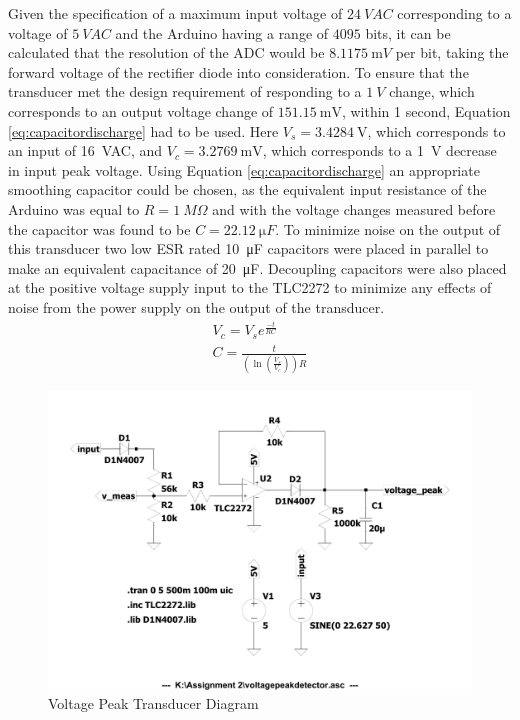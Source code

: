 Given the specification of a maximum input voltage of $\SI{24}{VAC}$ corresponding to a voltage of $\SI{5}{VAC}$ and the Arduino having a range of $4095$ bits, it can be calculated that the resolution of the ADC would be $\SI{8.1175}{\milli V}$ per bit, taking the forward voltage of the rectifier diode into consideration. To ensure that the transducer met the design requirement of responding to a $\SI{1}{V}$ change, which corresponds to an output voltage change of $\SI{151.15}{\milli \volt}$, within 1 second, Equation \ref{eq:capacitordischarge} had to be used. Here $V_{s}=\SI{3.4284}{\volt}$, which corresponds to an input of \SI{16}{VAC}, and $V_{c}=\SI{3.2769}{\milli \volt}$, which corresponds to a \SI{1}{V} decrease in input peak voltage. Using Equation \ref{eq:capacitordischarge} an appropriate smoothing capacitor could be chosen, as the equivalent input resistance of the Arduino was equal to $R=\SI{1}{M \Omega}$ and with the voltage changes measured before the capacitor was found to be $C=\SI{22.12}{\micro F}$. To minimize noise on the output of this transducer two low ESR rated \SI{10}{\micro F} capacitors were placed in parallel to make an equivalent capacitance of \SI{20}{\micro F}. Decoupling capacitors were also placed at the positive voltage supply input to the TLC2272 to minimize any effects of noise from the power supply on the output of the transducer.
\begin{align}
  V_{c} = V_{s}e^{\frac{-t}{RC}} \\
  C = \frac{t}{(\ln(\frac{V_{s}}{V_{c}}))R} \nonumber
   \label{eq:capacitordischarge}
\end{align}

\begin{figure}[h!]
    \centering
    \includegraphics[width = 0.65\linewidth]{Figures/voltagepeakdetector.pdf}
        \caption{Voltage Peak Transducer Diagram}
    \label{fig:voltagepeakdetector.pdf}
\end{figure}


